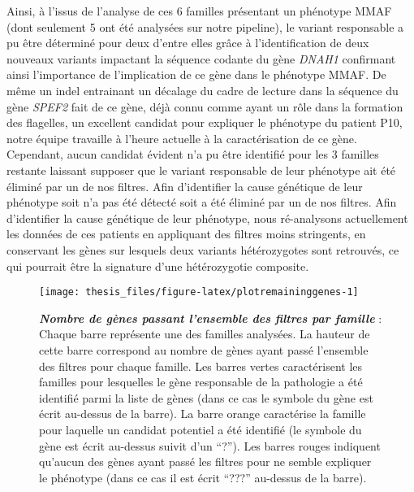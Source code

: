 \documentclass[12pt,twoside]{ugathesis}
\begin{document}
Ainsi, à l'issus de l'analyse de ces 6 familles présentant un phénotype
MMAF (dont seulement 5 ont été analysées sur notre pipeline), le variant
responsable a pu être déterminé pour deux d'entre elles grâce à
l'identification de deux nouveaux variants impactant la séquence codante
du gène \emph{DNAH1} confirmant ainsi l'importance de l'implication de
ce gène dans le phénotype MMAF. De même un indel entrainant un décalage
du cadre de lecture dans la séquence du gène \emph{SPEF2} fait de ce
gène, déjà connu comme ayant un rôle dans la formation des flagelles, un
excellent candidat pour expliquer le phénotype du patient P10, notre
équipe travaille à l'heure actuelle à la caractérisation de ce gène.
Cependant, aucun candidat évident n'a pu être identifié pour les 3
familles restante laissant supposer que le variant responsable de leur
phénotype ait été éliminé par un de nos filtres. Afin d'identifier la
cause génétique de leur phénotype soit n'a pas été détecté soit a été
éliminé par un de nos filtres. Afin d'identifier la cause génétique de
leur phénotype, nous ré-analysons actuellement les données de ces
patients en appliquant des filtres moins stringents, en conservant les
gènes sur lesquels deux variants hétérozygotes sont retrouvés, ce qui
pourrait être la signature d'une hétérozygotie composite.

\newpage

\begin{figure}

{\centering \texttt{[image: thesis\_files/figure-latex/plotremaininggenes-1]} 

}

\caption[Nombre de gènes passant l'ensemble des filtres par famille]{\textbf{\emph{Nombre de gènes passant
l'ensemble des filtres par famille}} : Chaque barre représente une des
familles analysées. La hauteur de cette barre correspond au nombre de
gènes ayant passé l'ensemble des filtres pour chaque famille. Les barres
vertes caractérisent les familles pour lesquelles le gène responsable de
la pathologie a été identifié parmi la liste de gènes (dans ce cas le
symbole du gène est écrit au-dessus de la barre). La barre orange
caractérise la famille pour laquelle un candidat potentiel a été
identifié (le symbole du gène est écrit au-dessus suivit d'un ``?'').
Les barres rouges indiquent qu'aucun des gènes ayant passé les filtres
pour ne semble expliquer le phénotype (dans ce cas il est écrit ``???''
au-dessus de la barre).}\label{fig:plotremaininggenes}
\end{figure}
\end{document}
